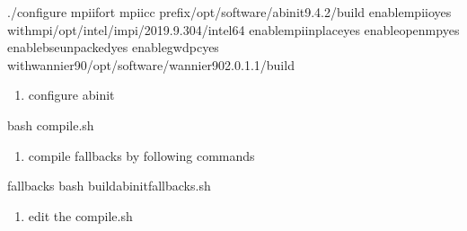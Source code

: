 \documentclass[a4paper,12pt,english]{sphinxmanual}
\begin{document}
\begin{sphinxVerbatim}[commandchars=\\\{\}]
./configure mpiifort mpiicc 
    \PYGZhy{}\PYGZhy{}prefix/opt/software/abinit\PYGZhy{}9.4.2/build 
    \PYGZhy{}\PYGZhy{}enable\PYGZhy{}mpi\PYGZhy{}ioyes 
    \PYGZhy{}\PYGZhy{}with\PYGZhy{}mpi/opt/intel/impi/2019.9.304/intel64 
    \PYGZhy{}\PYGZhy{}enable\PYGZhy{}mpi\PYGZhy{}inplaceyes 
    \PYGZhy{}\PYGZhy{}enable\PYGZhy{}openmpyes 
    \PYGZhy{}\PYGZhy{}enable\PYGZhy{}bse\PYGZhy{}unpackedyes 
    \PYGZhy{}\PYGZhy{}enable\PYGZhy{}gw\PYGZhy{}dpcyes 
    \PYGZhy{}\PYGZhy{}with\PYGZhy{}wannier90/opt/software/wannier90\PYGZhy{}2.0.1.1/build
\end{sphinxVerbatim}
\begin{enumerate}
%
\setcounter{enumi}{1}
\item {} 
\sphinxAtStartPar
configure abinit

\end{enumerate}

\begin{sphinxVerbatim}[commandchars=\\\{\}]
bash compile.sh
\end{sphinxVerbatim}
\begin{enumerate}
%
\setcounter{enumi}{2}
\item {} 
\sphinxAtStartPar
compile fallbacks by following commands

\end{enumerate}

\begin{sphinxVerbatim}[commandchars=\\\{\}]
 fallbacks  bash build\PYGZhy{}abinit\PYGZhy{}fallbacks.sh
\end{sphinxVerbatim}
\begin{enumerate}
%
\setcounter{enumi}{3}
\item {} 
\sphinxAtStartPar
edit the compile.sh

\end{enumerate}
\end{document}
